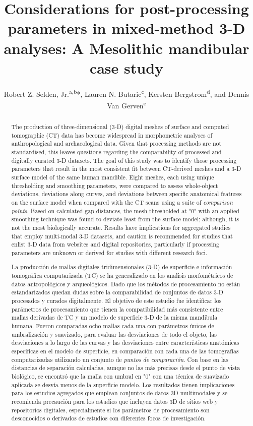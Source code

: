 \documentclass[review]{elsarticle}
\author{Robert Z. Selden, Jr.\textsuperscript{a,b}*, Lauren N. Butaric\textsuperscript{c}, Kersten Bergstrom\textsuperscript{d}, and Dennis Van Gerven\textsuperscript{e}}
\begin{document}
\begin{frontmatter}

\title{Considerations for post-processing parameters in mixed-method 3-D analyses: A Mesolithic mandibular case study}

\begin{abstract}
The production of three-dimensional (3-D) digital meshes of surface and computed tomographic (CT) data has become widespread in morphometric analyses of anthropological and archaeological data. Given that processing methods are not standardised, this leaves questions regarding the comparability of processed and digitally curated 3-D datasets. The goal of this study was to identify those processing parameters that result in the most consistent fit between CT-derived meshes and a 3-D surface model of the same human mandible. Eight meshes, each using unique thresholding and smoothing parameters, were compared to assess whole-object deviations, deviations along curves, and deviations between specific anatomical features on the surface model when compared with the CT scans using a suite of \textit{comparison points}. Based on calculated gap distances, the mesh thresholded at "0" with an applied smoothing technique was found to deviate least from the surface model; although, it is not the most biologically accurate. Results have implications for aggregated studies that employ multi-modal 3-D datasets, and caution is recommended for studies that enlist 3-D data from websites and digital repositories, particularly if processing parameters are unknown or derived for studies with different research foci.

\newpage
La producción de mallas digitales tridimensionales (3-D) de superficie e información tomográfica computarizada (TC) se ha generalizado en los analisis morfométricos de datos antropológicos y arqueológicos. Dado que los métodos de procesamiento no están estandarizados quedan dudas sobre la comparabilidad de conjuntos de datos 3-D procesados y curados digitalmente. El objetivo de este estudio fue identificar los parámetros de procesamiento que tienen la compatibilidad más consistente entre mallas derivadas de TC y un modelo de superficie 3-D de la misma mandibula humana. Fueron comparadas ocho mallas cada una con parámetros únicos de umbralización y suavizado, para evaluar las desviaciones de todo el objeto, las desviaciones a lo largo de las curvas y las desviaciones entre características anatómicas específicas en el modelo de superficie, en comparación con cada una de las tomografías computarizadas utilizando un conjunto de \textit{puntos de comparación}. Con base en las distancias de separación calculadas, aunque no las más precisas desde el punto de vista biológico, se encontró que la malla con umbral en "0" con una técnica de suavizado aplicada se desvía menos de la superficie modelo. Los resultados tienen implicaciones para los estudios agregados que emplean conjuntos de datos 3D multimodales y se recomienda precaución para los estudios que incluyen datos 3D de sitios web y repositorios digitales, especialmente si los parámetros de procesamiento son desconocidos o derivados de estudios con diferentes focos de investigación.
\end{abstract}


\end{frontmatter}
\end{document}
